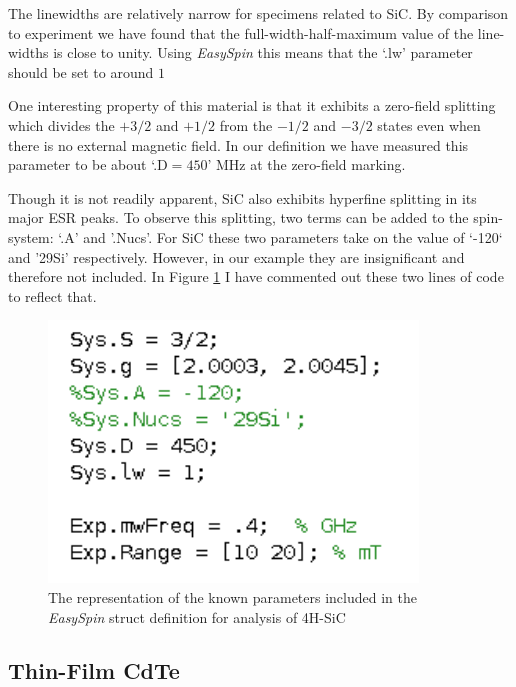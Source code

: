 \documentclass[oneside, astronomy, noacknowlegments]{BYUPhys}
\begin{document}
The linewidths are relatively narrow for specimens related to SiC. By comparison to experiment we have found that the full-width-half-maximum value of the line-widths is close to unity. Using \textit{EasySpin} this means that the `.lw' parameter should be set to around $1$

One interesting property of this material is that it exhibits a zero-field splitting which divides the $+3/2$ and $+1/2$ from the $-1/2$ and $-3/2$ states even when there is no external magnetic field. In our definition we have measured this parameter to be about `.D$=450$' MHz at the zero-field marking.

Though it is not readily apparent, SiC also exhibits hyperfine splitting in its major ESR peaks. To observe this splitting, two terms can be added to the spin-system: `.A' and '.Nucs'. For SiC these two parameters take on the value of `-120` and '29Si' respectively. However, in our example they are insignificant and therefore not included. In Figure \ref{fig:SiCParams} I have commented out these two lines of code to reflect that.

\begin{figure}
    \centerline{\includegraphics{sic_params_commented_fig}}
    \caption[The \textit{EasySpin} representation of SiC]{\label{fig:SiCParams}
     The representation of the known parameters included in the \textit{EasySpin} struct definition for analysis of 4H-SiC}
 \end{figure}
 
\subsection{Thin-Film CdTe}
\end{document}
